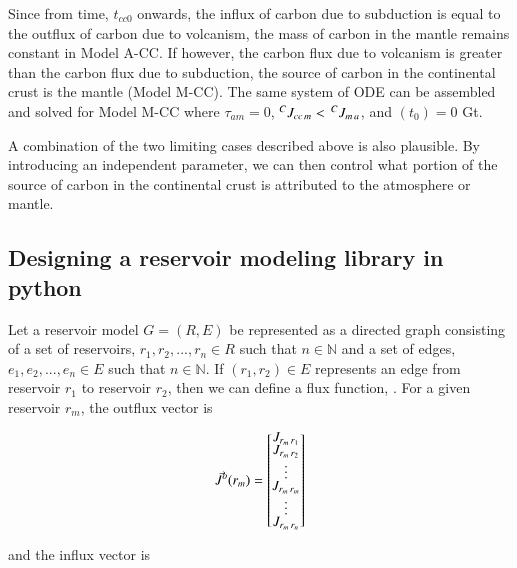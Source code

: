 Since from time, $t_{cc0}$ onwards, the influx of carbon due to subduction is equal to the outflux of carbon due to volcanism, the mass of carbon in the mantle remains constant in Model A-CC. If however, the carbon flux due to volcanism is greater than the carbon flux due to subduction, the source of carbon in the continental crust is the mantle (Model M-CC). The same system of ODE can be assembled and solved for Model M-CC where $\tau_{am} = 0$, $\mbox{${^CJ_{cc\,m}}$} < \, \mbox{${^CJ_{m\,a}}$}$, and $(t_0) = 0$ Gt.


A combination of the two limiting cases described above is also plausible. By introducing an independent parameter, we can then control what portion of the source of carbon in the continental crust is attributed to the atmosphere or mantle.

\subsection{Designing a reservoir modeling library in python}

Let a reservoir model $G = (R, E)$ be represented as a directed graph consisting of a set of reservoirs, $r_1, r_2, ..., r_{n} \in R$ such that $n \in \mathbb{N}$ and a set of edges, $e_1, e_2, ..., e_n \in E$ such that $n \in \mathbb{N}$. If $(r_1,r_2) \in E$ represents an edge from reservoir $r_1$ to reservoir $r_2$, then we can define a flux function, . For a given reservoir $r_m$, the outflux vector is

\begin{equation}
\renewcommand\arraystretch{0.5}
\vec{J}^{o}(r_m) = 
\begin{bmatrix}
    \flux{r_m}{r_1} \\
    \flux{r_m}{r_2} \\
    \vdots \\
    \flux{r_m}{r_m} \\
    \vdots \\
    \flux{r_m}{r_n}
\end{bmatrix}
\end{equation}

and the influx vector is


